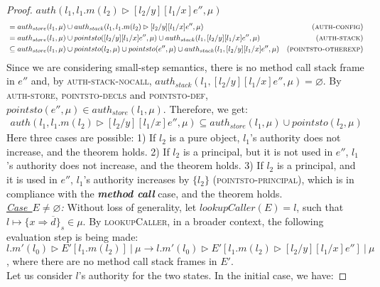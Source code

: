 \documentclass{llncs}
\begin{document}
\begin{proof}
\noindent$auth(l_1, l_1.m(l_2) \rhd [l_2/y][l_1/x]e'', \mu)$
\vspace{-7pt}
\begin{align*}
&= auth_{store}(l_1, \mu) \cup auth_{stack}(l_1, l_1.m(l_2) \rhd [l_2/y][l_1/x]e'', \mu) & (\textsc{auth-config})\\
&= auth_{store}(l_1, \mu) \cup pointsto([l_2/y][l_1/x]e'', \mu) \cup auth_{stack}(l_1, [l_2/y][l_1/x]e'', \mu) & (\textsc{auth-stack})\\
&\subseteq auth_{store}(l_1, \mu) \cup pointsto(l_2, \mu) \cup pointsto(e'', \mu) \cup auth_{stack}(l_1, [l_2/y][l_1/x]e'', \mu) & (\textsc{pointsto-otherexp})
\end{align*}
Since we are considering small-step semantics, there is no method call stack frame in $e''$ and, by \textsc{auth-stack-nocall}, $auth_{stack}(l_1, [l_2/y][l_1/x]e'', \mu) = \varnothing$. By \textsc{auth-store}, \textsc{pointsto-decls} and \textsc{pointsto-def}, $pointsto(e'', \mu) \in auth_{store}(l_1, \mu)$. Therefore, we get:
\begin{align*}
auth(l_1, l_1.m(l_2) \rhd [l_2/y][l_1/x]e'', \mu) \subseteq auth_{store}(l_1, \mu) \cup pointsto(l_2, \mu)
\end{align*}
Here three cases are possible: 1) If $l_2$ is a pure object, $l_1$'s authority does not increase, and the theorem holds. 2) If $l_2$ is a principal, but it is not used in $e''$, $l_1$'s authority does not increase, and the theorem holds. 3) If $l_2$ is a principal, and it is used in $e''$, $l_1$'s authority increases by $\{ l_2 \}$ (\textsc{pointsto-principal}), which is in compliance with the \textbf{\textit{method call}} case, and the theorem holds.\\

\noindent\textit{\mbox{\underline{Case $E \not= \varnothing$}}:} Without loss of generality, let \mbox{$lookupCaller(E) = l$}, such that \mbox{$l \mapsto \{ x \Rightarrow \overline{d} \}_{s} \in \mu$}. By \textsc{lookupCaller}, in a broader context, the following evaluation step is being made: \mbox{$l.m'(l_0) \rhd E'[l_1.m(l_2)]~|~\mu \longrightarrow l.m'(l_0) \rhd E'[l_1.m(l_2) \rhd [l_2/y] [l_1/x] e'']~|~\mu$}, where there are no method call stack frames in $E'$.\\

\noindent Let us consider $l$'s authority for the two states. In the initial case, we have:


\end{proof}
\end{document}
